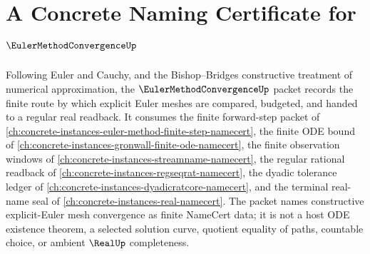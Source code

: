 \chapter{A Concrete Naming Certificate for $\EulerMethodConvergenceUp$}
\label{ch:concrete-instances-euler-method-convergence-namecert}

Following Euler and Cauchy, and the Bishop--Bridges constructive treatment of numerical approximation, the $\EulerMethodConvergenceUp$ packet records the finite route by which explicit Euler meshes are compared, budgeted, and handed to a regular real readback. It consumes the finite forward-step packet of \autoref{ch:concrete-instances-euler-method-finite-step-namecert}, the finite ODE bound of \autoref{ch:concrete-instances-gronwall-finite-ode-namecert}, the finite observation windows of \autoref{ch:concrete-instances-streamname-namecert}, the regular rational readback of \autoref{ch:concrete-instances-regseqrat-namecert}, the dyadic tolerance ledger of \autoref{ch:concrete-instances-dyadicratcore-namecert}, and the terminal real-name seal of \autoref{ch:concrete-instances-real-namecert}. The packet names constructive explicit-Euler mesh convergence as finite NameCert data; it is not a host ODE existence theorem, a selected solution curve, quotient equality of paths, countable choice, or ambient $\RealUp$ completeness.

